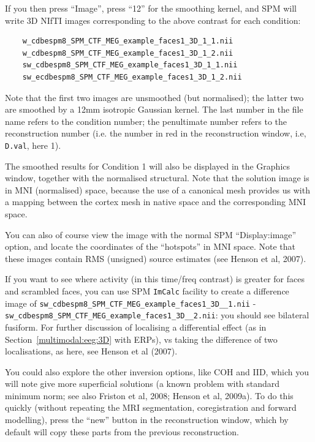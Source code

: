 If you then press ``Image'', press ``12'' for the smoothing kernel, and SPM will write 3D NIfTI images corresponding to the above contrast for each condition:

\begin{verbatim}
    w_cdbespm8_SPM_CTF_MEG_example_faces1_3D_1_1.nii
    w_cdbespm8_SPM_CTF_MEG_example_faces1_3D_1_2.nii
    sw_cdbespm8_SPM_CTF_MEG_example_faces1_3D_1_1.nii
    sw_ecdbespm8_SPM_CTF_MEG_example_faces1_3D_1_2.nii
\end{verbatim}

Note that the first two images are unsmoothed (but normalised); the latter two are smoothed by a 12mm isotropic Gaussian kernel. The last number in the file name refers to the condition number; the penultimate number refers to the reconstruction number (i.e. the number in red in the reconstruction window, i.e, \texttt{D.val}, here 1).

The smoothed results for Condition 1 will also be displayed in the Graphics window, together with the normalised structural. Note that the solution image is in MNI (normalised) space, because the use of a canonical mesh provides us with a mapping between the cortex mesh in native space and the corresponding MNI space.

You can also of course view the image with the normal SPM ``Display:image'' option, and locate the coordinates of the ``hotspots'' in MNI space. Note that these images contain RMS (unsigned) source estimates (see Henson et al, 2007).

If you want to see where activity (in this time/freq contrast) is greater for faces and scrambled faces, you can use SPM \texttt{ImCalc} facility to create a difference image of \texttt{sw\_\-cdbespm8\_\-SPM\_\-CTF\_\-MEG\_\-example\_\-faces1\_\-3D\_\_\-1.nii} - \texttt{sw\_\-cdbespm8\_\-SPM\_\-CTF\_\-MEG\_\-example\_\-faces1\_\-3D\_\_\-2.nii}: you should see bilateral fusiform. For further discussion of localising a differential effect (as in Section~\ref{multimodal:eeg:3D} with ERPs), vs taking the difference of two localisations, as here, see Henson et al (2007).

You could also explore the other inversion options, like COH and IID, which you will note give more superficial solutions (a known problem with standard minimum norm; see also Friston et al, 2008; Henson et al, 2009a). To do this quickly (without repeating the MRI segmentation, coregistration and forward modelling), press the ``new'' button in the reconstruction window, which by default will copy these parts from the previous reconstruction.

